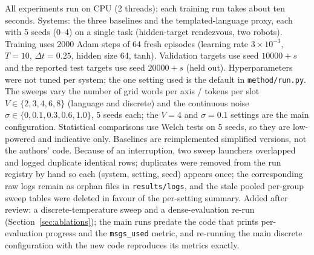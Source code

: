 All experiments run on CPU (2 threads); each training run takes about ten seconds. Systems: the three baselines and the templated-language proxy, each with 5 seeds (0--4) on a single task (hidden-target rendezvous, two robots). Training uses 2000 Adam steps of 64 fresh episodes (learning rate $3\times10^{-3}$, $T=10$, $\Delta t=0.25$, hidden size 64, tanh). Validation targets use seed $10000+s$ and the reported test targets use seed $20000+s$ (held out). Hyperparameters were not tuned per system; the one setting used is the default in \texttt{method/run.py}. The sweeps vary the number of grid words per axis / tokens per slot $V\in\{2,3,4,6,8\}$ (language and discrete) and the continuous noise $\sigma\in\{0,0.1,0.3,0.6,1.0\}$, 5 seeds each; the $V{=}4$ and $\sigma{=}0.1$ settings are the main configuration. Statistical comparisons use Welch tests on 5 seeds, so they are low-powered and indicative only. Baselines are reimplemented simplified versions, not the authors' code. Because of an interruption, two sweep launchers overlapped and logged duplicate identical rows; duplicates were removed from the run registry by hand so each (system, setting, seed) appears once; the corresponding raw logs remain as orphan files in \texttt{results/logs}, and the stale pooled per-group sweep tables were deleted in favour of the per-setting summary. Added after review: a discrete-temperature sweep and a dense-evaluation re-run (Section~\ref{sec:ablations}); the main runs predate the code that prints per-evaluation progress and the \texttt{msgs\_used} metric, and re-running the main discrete configuration with the new code reproduces its metrics exactly.
